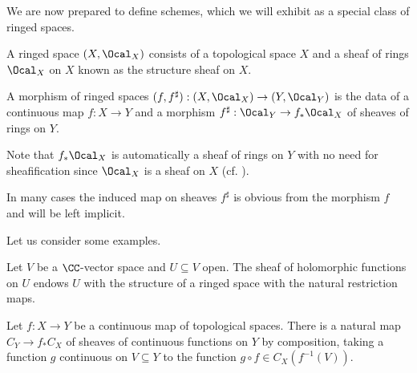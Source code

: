 We are now prepared to define schemes, which we will exhibit as a special class of ringed spaces. 
\begin{definition}\label{def: ringed space}
    A ringed space $(X,\Ocal_{X})$ consists of a topological space $X$ and a sheaf of rings $\Ocal_{X}$ on $X$ known as the structure sheaf on $X$. 
\end{definition}
\begin{definition}\label{def: morphism of ringed spaces}
    A morphism of ringed spaces $(f,f^{\sharp}):(X,\Ocal_{X})\to (Y,\Ocal_{Y})$ is the data of a continuous map $f:X\to Y$ and a morphism $f^{\sharp}:\Ocal_{Y}\to f_{*}\Ocal_{X}$ of sheaves of rings on $Y$. 
\end{definition}
\begin{remark}
    Note that $f_{*}\Ocal_{X}$ is automatically a sheaf of rings on $Y$ with no need for sheafification since $\Ocal_{X}$ is a sheaf on $X$ (cf. ). 
\end{remark}
\begin{remark}
    In many cases the induced map on sheaves $f^{\sharp}$ is obvious from the morphism $f$ and will be left implicit. 
\end{remark}
Let us consider some examples. 
\begin{example}\label{ex: holomorphic functions on open subspace of complex vector space}
    Let $V$ be a $\CC$-vector space and $U\subseteq V$ open. The sheaf of holomorphic functions on $U$ endows $U$ with the structure of a ringed space with the natural restriction maps. 
\end{example}
\begin{example}\label{ex: sheaves of continuous functions are ringed spaces}
    Let $f:X\to Y$ be a continuous map of topological spaces. There is a natural map $C_{Y}\to f_{*}C_{X}$ of sheaves of continuous functions on $Y$ by composition, taking a function $g$ continuous on $V\subseteq Y$ to the function $g\circ f\in C_{X}(f^{-1}(V))$.
\end{example}